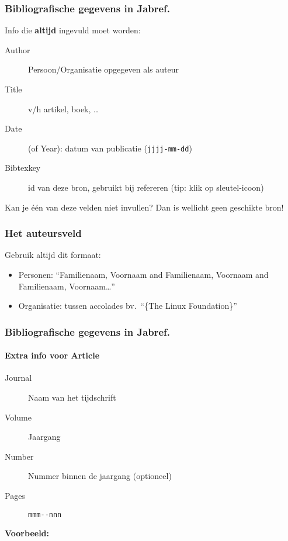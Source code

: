 \documentclass[aspectratio=169]{beamer}
\begin{document}
\begin{frame}
  \frametitle{Bibliografische gegevens in Jabref.}

  Info die \textbf{altijd} ingevuld moet worden:

  \begin{description}
    \item[Author] Persoon/Organisatie opgegeven als auteur
    \item[Title] v/h artikel, boek, \ldots
    \item[Date] (of Year): datum van publicatie (\texttt{jjjj-mm-dd})
    \item[Bibtexkey] id van deze bron, gebruikt bij refereren (tip: klik op sleutel-icoon)
  \end{description}

  \bigskip

  Kan je één van deze velden niet invullen? Dan is wellicht geen geschikte bron!
\end{frame}

\begin{frame}
  \frametitle{Het auteursveld}

  Gebruik altijd dit formaat:

  \begin{itemize}
    \item Personen: ``Familienaam, Voornaam and Familienaam, Voornaam and Familienaam, Voornaam\ldots''
    \item Organisatie: tussen accolades bv.\ ``\{The Linux Foundation\}''
  \end{itemize}

\end{frame}

\begin{frame}
  \frametitle{Bibliografische gegevens in Jabref.}
  \framesubtitle{Extra info voor Article}

  \begin{description}
    \item[Journal] Naam van het tijdschrift
    \item[Volume] Jaargang
    \item[Number] Nummer binnen de jaargang (optioneel)
    \item[Pages] \verb|mmm--nnn|
  \end{description}

  \bigskip

  \textbf{Voorbeeld:}

\end{frame}
\end{document}
